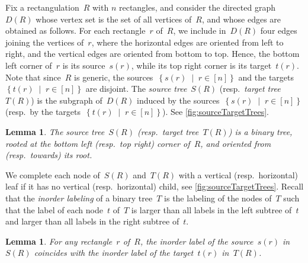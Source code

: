 \documentclass{amsart}
\newtheorem{lemma}[theorem]{Lemma}
\theoremstyle{definition}
\newcommand{\set}[2]{\left\{ #1 \;\middle|\; #2 \right\}} %
\newcommand{\darkblue}{\color{darkblue}} %
\newcommand{\defn}[1]{\textsl{\darkblue #1}} %
\begin{document}
Fix a rectangulation~$R$ with $n$ rectangles, and consider the directed graph~$D(R)$ whose vertex set is the set of all vertices of~$R$, and whose edges are obtained as follows.
For each rectangle~$r$ of~$R$, we include in~$D(R)$ four edges joining the vertices of~$r$, where the horizontal edges are oriented from left to right, and the vertical edges are oriented from bottom to top.
Hence, the bottom left corner of~$r$ is its source~$s(r)$, while its top right corner is its target~$t(r)$.
Note that since~$R$ is generic, the sources~$\set{s(r)}{r \in [n]}$ and the targets~$\set{t(r)}{r \in [n]}$ are disjoint.
The \defn{source tree}~$S(R)$ (resp.~\defn{target tree}~$T(R)$) is the subgraph of~$D(R)$ induced by the sources~$\set{s(r)}{r \in [n]}$ (resp.~by the targets~$\set{t(r)}{r \in [n]}$).
See \cref{fig:sourceTargetTrees}.

\begin{lemma}
The source tree~$S(R)$ (resp.~target tree~$T(R)$) is a binary tree, rooted at the bottom left (resp.~top right) corner of~$R$, and oriented from (resp.~towards) its root.
\end{lemma}

We complete each node of~$S(R)$ and~$T(R)$ with a vertical (resp.~horizontal) leaf if it has no vertical (resp.~horizontal) child, see \cref{fig:sourceTargetTrees}.
Recall that the \defn{inorder labeling} of a binary tree~$T$ is the labeling of the nodes of~$T$ such that the label of each node~$t$ of~$T$ is larger than all labels in the left subtree of~$t$ and larger than all labels in the right subtree of~$t$.

\begin{lemma}
For any rectangle~$r$ of~$R$, the inorder label of the source~$s(r)$ in~$S(R)$ coincides with the inorder label of the target~$t(r)$ in~$T(R)$.
\end{lemma}
\end{document}
